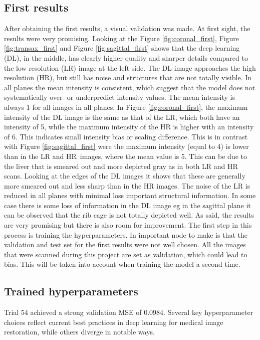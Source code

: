 \documentclass[twocolumn]{article}
\begin{document}
\subsection{First results}
After obtaining the first results, a visual validation was made. At first sight, the results were very promising. 
Looking at the Figure \ref{fig:coronal_first}, Figure \ref{fig:transax_first} and Figure \ref{fig:sagittal_first} shows that the deep learning (DL), in the middle, has clearly higher quality and sharper details compared to the low resolution (LR) image at the left side. 
The DL image approaches the high resolution (HR), but still has noise and structures that are not totally visible. 
In all planes the mean intensity is consistent, which suggest that the model does not systematically over- or underpredict intensity values. 
The mean intensity is always 1 for all images in all planes.
In Figure \ref{fig:coronal_first}, the maximum intensity of the DL image is the same as that of the LR, which both have an intensity of 5, while the maximum intensity of the HR is higher with an intensity of 6. 
This indicates small intensity bias or scaling difference. 
This is in contrast with Figure \ref{fig:sagittal_first} were the maximum intensity (equal to 4) is lower than in the LR and HR images, where the mean value is 5. 
This can be due to the liver that is smeared out and more depicted gray as in both LR and HR scans.
Looking at the edges of the DL images it shows that these are generally more smeared out and less sharp than in the HR images. 
The noise of the LR is reduced in all planes with minimal loss important structural information. 
In some case there is some loss of information in the DL image eg in the sagittal plane it can be observed that the rib cage is not totally depicted well.
As said, the results are very promising but there is also room for improvement. The first step in this process is training the hyperparameters. 
In important node to make is that the validation and test set for the first results were not well chosen. 
All the images that were scanned during this project are set as validation, which could lead to bias. 
This will be taken into account when training the model a second time.

\subsection{Trained hyperparameters}
Trial 54 achieved a strong validation MSE of 0.0984. 
Several key hyperparameter choices reflect current best practices in deep learning for medical image restoration, while others diverge in notable ways. 
\end{document}
